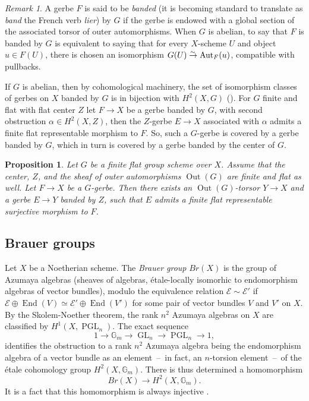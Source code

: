 \documentclass[12pt]{amsart}
\newcommand{\G}{{\mathbb G}}
\newcommand{\cE}{{\mathcal E}}
\newcommand{\eqto}{\stackrel{\lower1.5pt\hbox{$\scriptstyle\sim\,$}}\to}
\DeclareMathOperator{\GL}{GL}
\DeclareMathOperator{\PGL}{PGL}
\DeclareMathOperator{\Out}{Out}
\DeclareMathOperator{\Aut}{Aut}
\DeclareMathOperator{\End}{End}
\theoremstyle{plain}
\newtheorem  {prop} [thm] {Proposition}
\theoremstyle{definition}
\theoremstyle{remark}
\newtheorem {remark} [thm]  {Remark}
\begin{document}
\begin{remark}
A gerbe $F$ is said to be
{\em banded} (it is becoming standard to translate as {\em band}
the French verb {\em lier})
by $G$ if the gerbe is endowed
with a global section of the associated torsor of outer automorphisms.
When $G$ is abelian, to say that $F$ is banded by $G$ is equivalent to
saying that for every $X$-scheme $U$ and object $u\in F(U)$,
there is chosen an isomorphism $G(U)\eqto \Aut_{F}(u)$,
compatible with pullbacks.
\end{remark}

If $G$ is abelian,
then by cohomological machinery, the set of isomorphism classes of
gerbes on $X$ banded by $G$ is in bijection with $H^2(X,G)$
(\cite[\S{}IV.2]{Mi}).
For $G$ finite and flat with flat center $Z$ let
$F\to X$ be a gerbe banded by $G$,
with second obstruction $\alpha\in H^2(X,Z)$,
then the $Z$-gerbe $E\to X$ associated with $\alpha$
admits a finite flat representable morphism to $F$.
So, such a $G$-gerbe is covered by a gerbe banded by $G$,
which in turn is covered by a gerbe banded by the center of $G$.

\begin{prop} \label{p.gerbes}
Let $G$ be a finite flat group scheme over $X$.
Assume that the center, $Z$, and the sheaf of outer automorphisms
$\Out(G)$ are finite and flat as well.
Let $F\to X$ be a $G$-gerbe.
Then there exists an $\Out(G)$-torsor $Y\to X$ and
a gerbe $E\to Y$ banded by $Z$, such that $E$ admits a finite flat
representable surjective morphism to $F$.
\end{prop}


\subsection{Brauer groups}
Let $X$ be a Noetherian scheme.
The {\it Brauer group} $Br(X)$ is the group of Azumaya algebras
(sheaves of algebras, \'etale-locally isomorhic to endomorphism algebras
of vector bundles), modulo the equivalence relation
$\cE\sim\cE'$ if $\cE\oplus\End(V)\simeq \cE'\oplus\End(V')$ for
some pair of vector bundles $V$ and $V'$ on $X$.
By the Skolem-Noether theorem,
the rank $n^2$ Azumaya algebras on $X$ are classified by
$H^1(X,\PGL_n)$.
The exact sequence
$$1\to \G_m\to \GL_n\to \PGL_n\to 1,$$
identifies the obstruction to a rank $n^2$ Azumaya algebra being
the endomorphism
algebra of a vector bundle as an element~--~in fact,
an $n$-torsion element~--~of the \'etale cohomology group $H^2(X,\G_m)$.
There is thus determined a homomorphism
$$Br(X)\to H^2(X,\G_m).$$
It is a fact that this homomorphism is always injective \cite[IV Th.\ 2.5]{Mi}.
\end{document}
